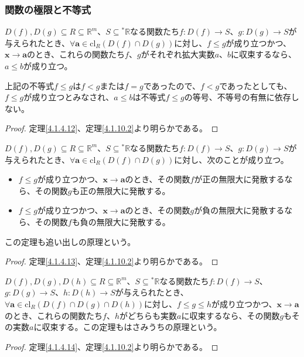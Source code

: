 \documentclass[dvipdfmx]{jsarticle}
\begin{document}
\subsubsection{関数の極限と不等式}%
\begin{thm}\label{4.1.10.11}
$D(f),D(g) \subseteq R \subseteq \mathbb{R}^{m}$、$S \subseteq{}^{*}\mathbb{R}$なる関数たち$f:D(f) \rightarrow S$、$g:D(g) \rightarrow S$が与えられたとき、$\forall\mathbf{a} \in \mathrm{cl}_{R}\left( D(f) \cap D(g) \right)$に対し、$f \leq g$が成り立つかつ、$\mathbf{x} \rightarrow \mathbf{a}$のとき、これらの関数たち$f$、$g$がそれぞれ拡大実数$a$、$b$に収束するなら、$a \leq b$が成り立つ。
\end{thm}\par
上記の不等式$f \leq g$は$f < g$または$f = g$であったので、$f < g$であったとしても、$f \leq g$が成り立つとみなされ、$a \leq b$は不等式$f \leq g$の等号、不等号の有無に依存しない。
\begin{proof} 定理\ref{4.1.4.12}、定理\ref{4.1.10.2}より明らかである。
\end{proof}
\begin{thm}[追い出しの原理]\label{4.1.10.12}
$D(f),D(g) \subseteq R \subseteq \mathbb{R}^{m}$、$S \subseteq{}^{*}\mathbb{R}$なる関数たち$f:D(f) \rightarrow S$、$g:D(g) \rightarrow S$が与えられたとき、$\forall\mathbf{a} \in \mathrm{cl}_{R}\left( D(f) \cap D(g) \right)$に対し、次のことが成り立つ。
\begin{itemize}
\item
  $f \leq g$が成り立つかつ、$\mathbf{x} \rightarrow \mathbf{a}$のとき、その関数$f$が正の無限大に発散するなら、その関数$g$も正の無限大に発散する。
\item
  $f \leq g$が成り立つかつ、$\mathbf{x} \rightarrow \mathbf{a}$のとき、その関数$g$が負の無限大に発散するなら、その関数$f$も負の無限大に発散する。
\end{itemize}
この定理も追い出しの原理という。
\end{thm}
\begin{proof} 定理\ref{4.1.4.13}、定理\ref{4.1.10.2}より明らかである。
\end{proof}
\begin{thm}[はさみうちの原理]\label{4.1.10.13}
$D(f),D(g),D(h) \subseteq R \subseteq \mathbb{R}^{m}$、$S \subseteq{}^{*}\mathbb{R}$なる関数たち$f:D(f) \rightarrow S$、$g:D(g) \rightarrow S$、$h:D(h) \rightarrow S$が与えられたとき、$\forall\mathbf{a} \in \mathrm{cl}_{R}\left( D(f) \cap D(g) \cap D(h) \right)$に対し、$f \leq g \leq h$が成り立つかつ、$\mathbf{x} \rightarrow \mathbf{a}$のとき、これらの関数たち$f$、$h$がどちらも実数$a$に収束するなら、その関数$g$もその実数$a$に収束する。この定理もはさみうちの原理という。
\end{thm}
\begin{proof} 定理\ref{4.1.4.14}、定理\ref{4.1.10.2}より明らかである。
\end{proof}
\end{document}
